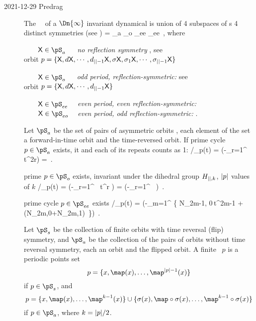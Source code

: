 \begin{description}
\bigskip\bigskip
\item[2021-12-29 Predrag]

The \statesp\ \pS\ of a $\Dn{\infty}$ invariant dynamical is union of
4 subspaces of {\lattstate}s 4 distinct symmetries
(see )
\beq
\pS = \pS_{a} \cup \pS_{o} \cup \pS_{ee} \cup \pS_{ee}
\,,
where

\noindent
$\qquad \Xx\in\pS_{a}\quad\;$
    {\em no reflection symmetry} ,
                                 see 
\\ \qquad\qquad\qquad
orbit $p=\{\mathsf{X}, d\mathsf{X}, \cdots, d_{{||}-1}\mathsf{X},
       \sigma\mathsf{X}, \sigma_1\mathsf{X}, \cdots, \sigma_{{||}-1}\mathsf{X}\}$

\noindent
$\qquad \Xx\in\pS_{o}\quad\;$
    {\em odd period, reflection-symmetric:} 
                                            see 
\\ \qquad\qquad\qquad
orbit $p=\{\mathsf{X}, d\mathsf{X}, \cdots, d_{{||}-1}\mathsf{X}\}$

\noindent
$\qquad \Xx\in\pS_{ee}\quad$
    {\em even period, even reflection-symmetric:} 
\\

\noindent
$\qquad \Xx\in\pS_{eo}\quad$
    {\em even period, odd reflection-symmetric:} .

Let $\pS_{a}$ be the set of pairs of asymmetric orbits
 , each element of
the set a forward-in-time orbit and the time-reversed orbit.
If prime cycle $p \in \pS_{a}$ exists, it and each of its repeats counts
as 1:
/\zeta_{p}(t) =
\exp \Big(-\sum_{r=1}^{\infty} \, t^{2r}\Big)
    =
\,.

prime {\lattstate} $p \in \pS_{o}$ exists,
{\lattstate} invariant under the dihedral group $H_{{||},k}$, ${|p|}$
values of $k$
/\zeta_{p}(t) =
\exp \Big(-\sum_{r=1}^{\infty} \,
                     t^{r}
      \Big) =
\exp \Big(-\sum_{r=1}^{\infty} \,
      \Big)
\,.

prime cycle $p \in \pS_{ee}$ exists
/\zeta_{p}(t) =
\exp \Big(-\sum_{m=1}^{\infty} \left\{
       N_{2m-1, 0}\,t^{2m-1}
       + \left(N_{2m,0}+N_{2m,1}\right)\,
                               \right\}\Big)
\,.


Let $\pS_{s}$ be the collection of finite orbits with time
reversal (flip) symmetry, and $\pS_{a}$ be the collection of the pairs of
orbits without time reversal symmetry, each an orbit and the flipped
orbit. A finite \orbit\ $p$ is a periodic points set
\[
p = \{\ssp, \map(\ssp), \dots, \map^{\cl{p}-1}(\ssp)\}
\]
if $p \in \pS_{s}$, and
\[
p = \{\ssp, \map(\ssp), \dots, \map^{k-1}(\ssp)\} \cup
\{\Refl(\ssp), \map\circ\Refl(\ssp), \dots, \map^{k-1}\circ\Refl(\ssp)\}
\]
if $p \in \pS_{a}$, where $k={|p|}/2$.


\end{description}
